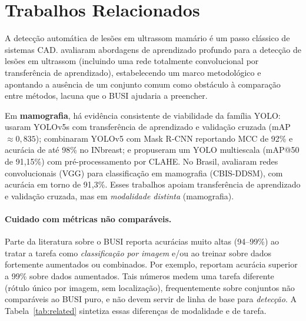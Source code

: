 \documentclass[11pt,a4paper]{article}
\begin{document}
\section{Trabalhos Relacionados}\label{sec:related}

A detecção automática de lesões em ultrassom mamário é um passo clássico de
sistemas CAD. \citet{yap2018} avaliaram abordagens de aprendizado profundo para a
detecção de lesões em ultrassom (incluindo uma rede totalmente convolucional por
transferência de aprendizado), estabelecendo um marco metodológico e apontando a
ausência de um conjunto comum como obstáculo à comparação entre métodos, lacuna
que o BUSI \citep{aldhabyani2020} ajudaria a preencher.

Em \textbf{mamografia}, há evidência consistente de viabilidade da família YOLO:
\citet{prinzi2024} usaram YOLOv5s com transferência de aprendizado e validação
cruzada (mAP $\approx 0{,}835$); \citet{anas2024} combinaram YOLOv5 com Mask
R-CNN reportando MCC de 92\% e acurácia de até 98\% no INbreast; e
\citet{mohammed2024} propuseram um YOLO multiescala (mAP@50 de 91,15\%) com
pré-processamento por CLAHE. No Brasil, \citet{wurzel2022} avaliaram redes
convolucionais (VGG) para classificação em mamografia (CBIS-DDSM), com acurácia
em torno de 91,3\%. Esses trabalhos apoiam transferência de aprendizado e
validação cruzada, mas em \emph{modalidade distinta} (mamografia).

\paragraph{Cuidado com métricas não comparáveis.} Parte da literatura sobre o
BUSI reporta acurácias muito altas (94--99\%) ao tratar a tarefa como
\emph{classificação por imagem} e/ou ao treinar sobre dados fortemente aumentados
ou combinados. Por exemplo, \citet{jabeen2022} reportam acurácia superior a
99\% sobre dados aumentados. Tais números medem uma tarefa diferente (rótulo único
por imagem, sem localização), frequentemente sobre conjuntos não comparáveis ao
BUSI puro, e não devem servir de linha de base para \emph{detecção}. A
Tabela~\ref{tab:related} sintetiza essas diferenças de modalidade e de tarefa.
\end{document}
